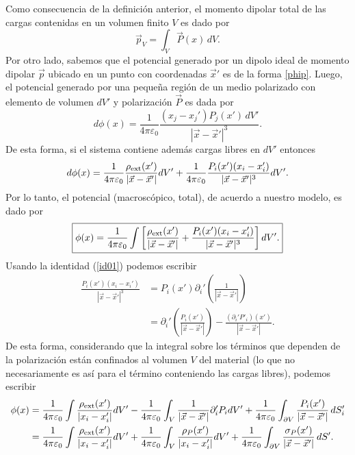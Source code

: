 Como consecuencia de la definición anterior, el momento dipolar
total de las cargas contenidas en un volumen finito $V$ es dado por
\begin{equation}\label{pintPdV}
 \vec{p}_V=\int_V \vec{P}(x)\,dV.
\end{equation}
Por otro lado, sabemos que el potencial generado por un dipolo ideal de momento dipolar $\vec{p}$ ubicado en un punto con coordenadas $\vec{x}'$ es de la forma \eqref{phip}. Luego, el potencial generado por una pequeña región de un medio polarizado con elemento de volumen $dV'$ y polarización $\vec{P}$ es dada por
\begin{equation}
d\phi(x)=\frac{1}{4\pi\varepsilon_0}\frac{(x_j-x_j')P_j(x')\,dV'}{|\vec{x}-\vec{
x}'|^3}.
\end{equation}
De esta forma, si el sistema contiene además cargas libres en $dV'$ entonces
\begin{equation}
d\phi(x)=\frac{1}{4\pi\varepsilon_0}\frac{\rho_{\rm
ext}(x')}{|\vec{x}-\vec{x}'|}dV'+\frac {1}{
4\pi\varepsilon_0}\frac{P_i(x')(x_i-x_i')}{|\vec{x}-\vec{x}'|^3}dV'.
\end{equation}
Por lo tanto, el potencial (macroscópico, total), de acuerdo a nuestro modelo, es dado por
\begin{equation}
\boxed{\phi(x)=\frac{1}{4\pi\varepsilon_0}\int\left[\frac{\rho_{\rm
ext}(x')}{|\vec{x}-\vec{x}'|}+\frac{P_i(x')(x_i-x_i')}{|\vec{x}-\vec{x}'|^3}\right]dV'.}
\end{equation}
Usando la identidad (\ref{id01}) podemos escribir
\begin{align}
\frac{P_i(x')(x_i-x_i')}{|\vec{x}-\vec{x}'|^3}  &
=P_i(x')\partial_i'\left(  \frac{1}{|\vec{x}-\vec{x}'|}\right)\\
&=\partial_i'\left(\frac{P_i(x')}{|\vec{x}-\vec{x}'|}\right)-\frac{
(\partial_i'P'_i)(x')} {|\vec{x}-\vec{ x}'|}.
\end{align}
De esta forma, considerando que la integral sobre los términos que dependen de la polarización están confinados al volumen $V$ del material (lo que no necesariamente es así para el término conteniendo las cargas libres), podemos escribir
\begin{align}
\phi(x)& =\frac{1}{4\pi\varepsilon_0}\int\frac{\rho_{\rm ext}(x')}{|x_i-x_i'|}dV'-\frac{1}{4\pi\varepsilon_0}\int_V\frac{1}
{|\vec{x}-\vec{x}'|}\partial_i'P_idV'+\frac{1}{4\pi\varepsilon_0}\int_{
\partial V}\frac{P_i(x')}{|\vec{x}-\vec{x}'|}\,dS'_i \\
& =\frac{1}{4\pi\varepsilon_0}\int\frac{\rho_{\rm ext}(x')}{|x_i-x_i'|}dV'+\frac{1}{4\pi\varepsilon_0}\int_V\frac{\rho_P(x')}{|x_i-x_i'|}dV'+\frac{1}{4\pi\varepsilon_0}\int_{
\partial V}\frac{\sigma_P(x')}{|\vec{x}-\vec{x}'|}\,dS' .
\end{align}
